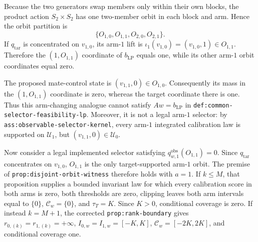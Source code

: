Because the two generators swap members only within their own blocks, the product action \(S_2\times S_2\) has one two-member orbit in each block and arm. Hence the orbit partition is
\[\{O_{1,0},O_{1,1},O_{2,0},O_{2,1}\}.\]
If \(q_{\mathrm{tar}}\) is concentrated on \(v_{1,0}\), its arm-\(1\) lift is \(\iota_1(v_{1,0})=(v_{1,0},1)\in O_{1,1}\). Therefore the \((1,O_{1,1})\) coordinate of \(b_{\mathrm{LP}}\) equals one, while its other arm-\(1\) orbit coordinates equal zero.

The proposed mate-control state is \((v_{1,1},0)\in O_{1,0}\). Consequently its mass in the \((1,O_{1,1})\) coordinate is zero, whereas the target coordinate there is one. Thus this arm-changing analogue cannot satisfy \(Aw=b_{\mathrm{LP}}\) in \texttt{def:common-selector-feasibility-lp}. Moreover, it is not a legal arm-\(1\) selector: by \texttt{ass:observable-selector-kernel}, every arm-\(1\) integrated calibration law is supported on \(\mathcal U_1\), but \((v_{1,1},0)\in\mathcal U_0\).

Now consider a legal implemented selector satisfying \(q^{\mathrm{obs}}_{w,1}(O_{1,1})=0\). Since \(q_{\mathrm{tar}}\) concentrates on \(v_{1,0}\), \(O_{1,1}\) is the only target-supported arm-\(1\) orbit. The premise of \texttt{prop:disjoint-orbit-witness} therefore holds with \(a=1\). If \(k\le M\), that proposition supplies a bounded invariant law for which every calibration score in both arms is zero, both thresholds are zero, clipping leaves both arm intervals equal to \(\{0\}\), \(\mathcal C_w=\{0\}\), and \(\tau_T=K\). Since \(K>0\), conditional coverage is zero. If instead \(k=M+1\), the corrected \texttt{prop:rank-boundary} gives \(r_{0,(k)}=r_{1,(k)}=+\infty\), \(I_{0,w}=I_{1,w}=[-K,K]\), \(\mathcal C_w=[-2K,2K]\), and conditional coverage one.